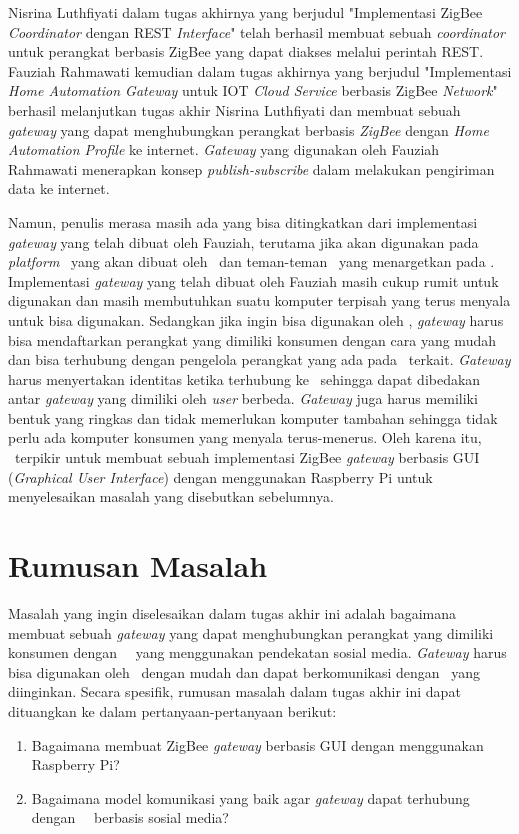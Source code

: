 Nisrina Luthfiyati dalam tugas akhirnya yang berjudul "Implementasi ZigBee \textit{Coordinator} dengan REST \textit{Interface}"\cite{SkripsiNina} telah berhasil membuat sebuah \textit{coordinator} untuk perangkat berbasis ZigBee yang dapat diakses melalui perintah REST. Fauziah Rahmawati kemudian dalam tugas akhirnya yang berjudul "Implementasi \textit{Home Automation Gateway} untuk IOT \textit{Cloud Service} berbasis ZigBee \textit{Network}"\cite{SkripsiFarah} berhasil melanjutkan tugas akhir Nisrina Luthfiyati dan membuat sebuah \textit{gateway} yang dapat menghubungkan perangkat berbasis \textit{ZigBee} dengan \textit{Home Automation Profile} ke internet. \textit{Gateway} yang digunakan oleh Fauziah Rahmawati menerapkan konsep \textit{publish-subscribe} dalam melakukan pengiriman data ke internet.

Namun, penulis merasa masih ada yang bisa ditingkatkan dari implementasi \textit{gateway} yang telah dibuat oleh Fauziah, terutama jika akan digunakan pada \textit{platform} \iot~yang akan dibuat oleh \saya~dan teman-teman \saya~yang menargetkan pada \eu. Implementasi \textit{gateway} yang telah dibuat oleh Fauziah masih cukup rumit untuk digunakan dan masih membutuhkan suatu komputer terpisah yang terus menyala untuk bisa digunakan. Sedangkan jika ingin bisa digunakan oleh \eu, \textit{gateway} harus bisa mendaftarkan perangkat yang dimiliki konsumen dengan cara yang mudah dan bisa terhubung dengan pengelola perangkat yang ada pada \plat~terkait. \textit{Gateway} harus menyertakan identitas ketika terhubung ke \plat~sehingga dapat dibedakan antar \textit{gateway} yang dimiliki oleh \textit{user} berbeda. \textit{Gateway} juga harus memiliki bentuk yang ringkas dan tidak memerlukan komputer tambahan sehingga tidak perlu ada komputer konsumen yang menyala terus-menerus. Oleh karena itu, \saya~terpikir untuk membuat sebuah implementasi ZigBee \textit{gateway} berbasis GUI (\textit{Graphical User Interface}) dengan menggunakan Raspberry Pi untuk menyelesaikan masalah yang disebutkan sebelumnya.


\section{Rumusan Masalah}
Masalah yang ingin diselesaikan dalam tugas akhir ini adalah bagaimana membuat sebuah \textit{gateway} yang dapat menghubungkan perangkat yang dimiliki konsumen dengan \plat~\iot~yang menggunakan pendekatan sosial media. \textit{Gateway} harus bisa digunakan oleh \eu~dengan mudah dan dapat berkomunikasi dengan \plat~yang diinginkan. Secara spesifik, rumusan masalah dalam tugas akhir ini dapat dituangkan ke dalam pertanyaan-pertanyaan berikut:
\begin{enumerate}
	\item Bagaimana membuat ZigBee \textit{gateway} berbasis GUI dengan menggunakan Raspberry Pi?
	\item Bagaimana model komunikasi yang baik agar \textit{gateway} dapat terhubung dengan \plat~\iot~berbasis sosial media?
\end{enumerate}

